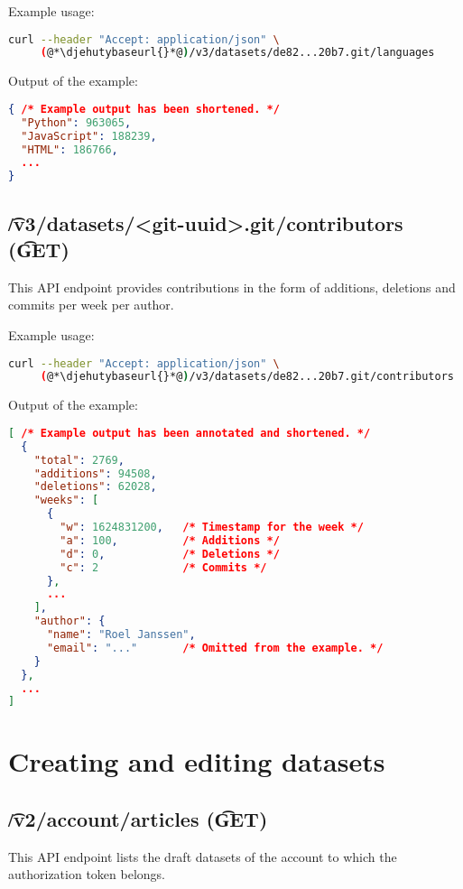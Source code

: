   Example usage:
\begin{lstlisting}[language=bash]
curl --header "Accept: application/json" \
     (@*\djehutybaseurl{}*@)/v3/datasets/de82...20b7.git/languages
\end{lstlisting}

  Output of the example:
\begin{lstlisting}[language=JSON]
{ /* Example output has been shortened. */
  "Python": 963065,
  "JavaScript": 188239,
  "HTML": 186766,
  ...
}
\end{lstlisting}

\subsection{\t{/v3/datasets/<git-uuid>.git/contributors} (\t{GET})}

  This API endpoint provides contributions in the form of additions,
  deletions and commits per week per author.

  Example usage:
\begin{lstlisting}[language=bash]
curl --header "Accept: application/json" \
     (@*\djehutybaseurl{}*@)/v3/datasets/de82...20b7.git/contributors
\end{lstlisting}

  Output of the example:
\begin{lstlisting}[language=JSON]
[ /* Example output has been annotated and shortened. */
  {
    "total": 2769,
    "additions": 94508,
    "deletions": 62028,
    "weeks": [
      {
        "w": 1624831200,   /* Timestamp for the week */
        "a": 100,          /* Additions */
        "d": 0,            /* Deletions */
        "c": 2             /* Commits */
      },
      ...
    ],
    "author": {
      "name": "Roel Janssen",
      "email": "..."       /* Omitted from the example. */
    }
  },
  ...
]
\end{lstlisting}

\section{Creating and editing datasets}

\subsection{\t{/v2/account/articles} (\t{GET})}

  This API endpoint lists the draft datasets of the account to which the
  authorization token belongs.


